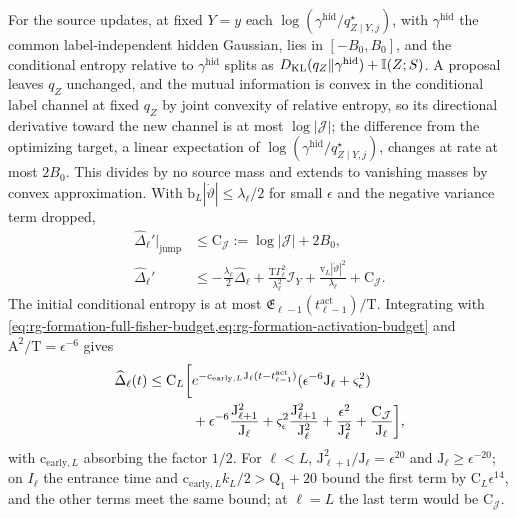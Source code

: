 For the source updates, at fixed \(Y=y\) each
\(\log(\gamma^{\mathrm{hid}}/q^\star_{Z\mid Y,j})\), with \(\gamma^{\mathrm{hid}}\)
the common label-independent hidden Gaussian, lies in \([-B_0,B_0]\), and the
conditional entropy relative to \(\gamma^{\mathrm{hid}}\) splits as
\(D_{\mathrm{KL}}(q_Z\Vert\gamma^{\mathrm{hid}})+\mathbb I(Z;S)\). A proposal leaves \(q_Z\)
unchanged, and the mutual information is convex in the conditional label
channel at fixed \(q_Z\) by joint convexity of relative entropy, so its
directional derivative toward the new channel is at most \(\log|\mathcal J|\);
the difference from the optimizing target, a linear expectation of
\(\log(\gamma^{\mathrm{hid}}/q^\star_{Z\mid Y,j})\), changes at rate at most
\(2B_0\). This divides by no source mass and extends to vanishing masses by
convex approximation. With \(\mathrm b_L|\dot\vartheta|\le\lambda_\ell/2\) for
small \(\epsilon\) and the negative variance term dropped,
\begin{align}
 \widehat\Delta_\ell'|_{\mathrm{jump}}&\le
 \mathrm C_{\mathcal J}:=\log|\mathcal J|+2B_0,
 \label{eq:rg-formation-conditional-jump-remainder}\\
 \widehat\Delta_\ell'
 &\le-\frac{\lambda_\ell}{2}\widehat\Delta_\ell
     +\frac{\mathrm T\Gamma_\ell^2}{\lambda_\ell^2}\mathcal I_Y
     +\frac{\mathrm v_L|\dot\vartheta|^2}{\lambda_\ell}
     +\mathrm C_{\mathcal J}.
 \label{eq:rg-formation-conditional-differential-bound}
\end{align}
The initial conditional entropy is at most
\(\mathfrak E_{\ell-1}(t^{\mathrm{act}}_{\ell-1})/\mathrm T\). Integrating with
\cref{eq:rg-formation-full-fisher-budget,eq:rg-formation-activation-budget}
and \(\mathrm A^2/\mathrm T=\epsilon^{-6}\) gives
\begin{align}
 \widehat\Delta_\ell(t)\le \mathrm C_L\bigg[
 &e^{-\mathrm c_{\mathrm{early},L}\mathrm J_\ell(t-t^{\mathrm{act}}_{\ell-1})}
                 (\epsilon^{-6}\mathrm J_\ell+\varsigma_\epsilon^2)
 \notag\\
 &+\epsilon^{-6}\frac{\mathrm J_{\ell+1}^2}{\mathrm J_\ell}
 +\varsigma_\epsilon^2\frac{\mathrm J_{\ell+1}^2}{\mathrm J_\ell^2}
 +\frac{\epsilon^2}{\mathrm J_\ell^2}+\frac{\mathrm C_{\mathcal J}}{\mathrm J_\ell}\bigg],
 \label{eq:rg-formation-early-entropy-bound}
\end{align}
with \(\mathrm c_{\mathrm{early},L}\) absorbing the factor \(1/2\). For
\(\ell<L\), \(\mathrm J_{\ell+1}^2/\mathrm J_\ell=\epsilon^{20}\) and
\(\mathrm J_\ell\ge\epsilon^{-20}\); on \(I_\ell\) the entrance time and
\(\mathrm c_{\mathrm{early},L}k_L/2>\mathrm Q_1+20\) bound the first term by
\(\mathrm C_L\epsilon^{14}\), and the other terms meet the same bound; at
\(\ell=L\) the last term would be \(\mathrm C_{\mathcal J}\).

